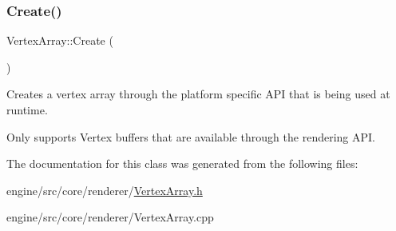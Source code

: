 \subsubsection{\texorpdfstring{Create()}{Create()}}
{\footnotesize\ttfamily Vertex\+Array\+::\+Create (\begin{DoxyParamCaption}{ }\end{DoxyParamCaption})\hspace{0.3cm}{\ttfamily [static]}}



Creates a vertex array through the platform specific A\+PI that is being used at runtime. 

Only supports Vertex buffers that are available through the rendering A\+PI. 

The documentation for this class was generated from the following files\+:\begin{DoxyCompactItemize}
\item 
engine/src/core/renderer/\hyperlink{VertexArray_8h}{Vertex\+Array.\+h}\item 
engine/src/core/renderer/Vertex\+Array.\+cpp\end{DoxyCompactItemize}
